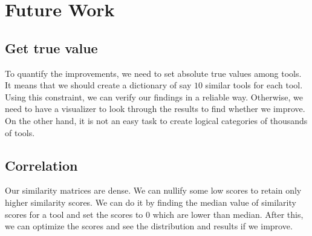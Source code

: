 \chapter{Future Work}

\section{Get true value}
To quantify the improvements, we need to set absolute true values among tools. It means that we should create a dictionary of say $10$ similar tools for each tool. Using this constraint, we can verify our findings in a reliable way. Otherwise, we need to have a visualizer to look through the results to find whether we improve. On the other hand, it is not an easy task to create logical categories of thousands of tools.

\section{Correlation}
Our similarity matrices are dense. We can nullify some low scores to retain only higher similarity scores. We can do it by finding the median value of similarity scores for a tool and set the scores to 0 which are lower than median. After this, we can optimize the scores and see the distribution and results if we improve. 


